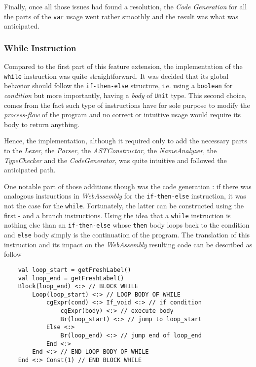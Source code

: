 Finally, once all those issues had found a resolution, the \textit{Code Generation} for all the parts of the \texttt{var} usage went rather smoothly and the result was what was anticipated.

\subsubsection{While Instruction}

Compared to the first part of this feature extension, the implementation of the \texttt{while} instruction was quite straightforward. It was decided that its global behavior should follow the \texttt{if-then-else} structure, i.e. using a \texttt{boolean} for \textit{condition} but more importantly, having a \textit{body} of \texttt{Unit} type. This second choice, comes from the fact such type of instructions have for sole purpose to modify the \textit{process-flow} of the program and no correct or intuitive usage would require its body to return anything. 

Hence, the implementation, although it required only to add the necessary parts to the \textit{Lexer}, the \textit{Parser}, the \textit{ASTConstructor}, the \textit{NameAnalyzer}, the \textit{TypeChecker} and the \textit{CodeGenerator}, was quite intuitive and followed the anticipated path.

One notable part of those additions though was the code generation : if there was analogous instructions in \textit{WebAssembly} for the \texttt{if-then-else} instruction, it was not the case for the \texttt{while}. Fortunately, the latter can be constructed using the first - and a branch instructions. Using the idea that a \texttt{while} instruction is nothing else than an \texttt{if-then-else} whose \texttt{then} body loops back to the condition and \texttt{else} body simply is the continuation of the program. The translation of this instruction and its impact on the \textit{WebAssembly} resulting code can be described as follow
\begin{lstlisting}
    val loop_start = getFreshLabel()
    val loop_end = getFreshLabel()
    Block(loop_end) <:> // BLOCK WHILE
        Loop(loop_start) <:> // LOOP BODY OF WHILE
            cgExpr(cond) <:> If_void <:> // if condition
                cgExpr(body) <:> // execute body
                Br(loop_start) <:> // jump to loop_start
            Else <:> 
                Br(loop_end) <:> // jump end of loop_end
            End <:>
        End <:> // END LOOP BODY OF WHILE
    End <:> Const(1) // END BLOCK WHILE
\end{lstlisting}


